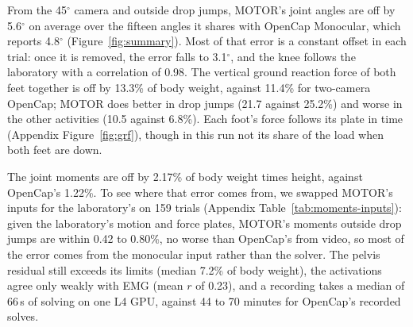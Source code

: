 \documentclass[11pt]{article}
\newcommand{\dg}{\ensuremath{^\circ}}
\begin{document}

From the 45\dg{} camera and outside drop jumps, MOTOR's joint angles are off by 5.6\dg{} on average over the fifteen
angles it shares with OpenCap Monocular, which reports 4.8\dg{} (Figure~\ref{fig:summary}). Most of that error is a
constant offset in each trial: once it is removed, the error falls to 3.1\dg, and the knee follows the laboratory with a
correlation of 0.98. The vertical ground reaction force of both feet together is off by 13.3\% of body weight, against
11.4\% for two-camera OpenCap; MOTOR does better in drop jumps (21.7 against 25.2\%) and worse in the other activities
(10.5 against 6.8\%). Each foot's force follows its plate in time (Appendix Figure~\ref{fig:grf}), though in this run
not its share of the load when both feet are down.

The joint moments are off by 2.17\% of body weight times height, against OpenCap's 1.22\%. To see where that error
comes from, we swapped MOTOR's inputs for the laboratory's on 159 trials (Appendix Table~\ref{tab:moments-inputs}):
given the laboratory's motion and force plates, MOTOR's moments outside drop jumps are within 0.42 to 0.80\%, no worse
than OpenCap's from video, so most of the error comes from the monocular input rather than the solver. The pelvis
residual still exceeds its limits (median 7.2\% of body weight), the activations agree only weakly with EMG (mean $r$ of
0.23), and a recording takes a median of 66\,s of solving on one L4 GPU, against 44 to 70 minutes for OpenCap's recorded
solves.
\end{document}
